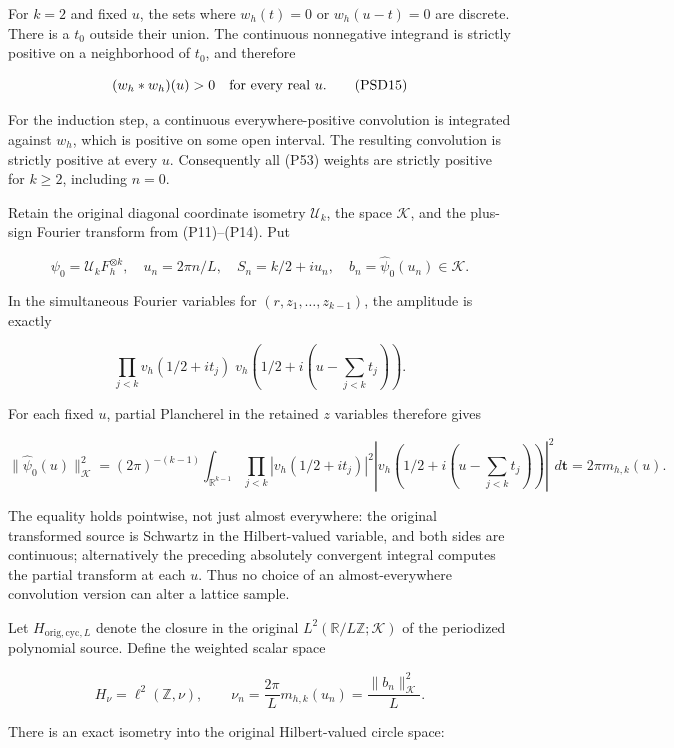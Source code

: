 For \(k=2\) and fixed \(u\), the sets where \(w_h(t)=0\) or \(w_h(u-t)=0\) are discrete. There is a \(t_0\) outside their union. The continuous nonnegative integrand is strictly positive on a neighborhood of \(t_0\), and therefore

\[
(w_h*w_h)(u)>0\quad\hbox{for every real }u.
\tag{PSD15}
\]

For the induction step, a continuous everywhere-positive convolution is integrated against \(w_h\), which is positive on some open interval. The resulting convolution is strictly positive at every \(u\). Consequently all (P53) weights are strictly positive for \(k\ge 2\), including \(n=0\).

Retain the original diagonal coordinate isometry \(\mathcal U_k\), the space \(\mathcal K\), and the plus-sign Fourier transform from (P11)--(P14). Put

\[
\psi_0=\mathcal U_kF_h^{\otimes k},\quad
u_n=2\pi n/L,\quad S_n=k/2+iu_n,\quad
b_n=\widehat\psi_0(u_n)\in\mathcal K.
\]

In the simultaneous Fourier variables for \((r,z_1,\ldots,z_{k-1})\), the amplitude is exactly

\[
\prod_{j<k}v_h(1/2+it_j)\;
v_h\left(1/2+i\left(u-\sum_{j<k}t_j\right)\right).
\]

For each fixed \(u\), partial Plancherel in the retained \(z\) variables therefore gives

\[
\|\widehat\psi_0(u)\|_{\mathcal K}^2
=(2\pi)^{-(k-1)}\int_{\mathbb R^{k-1}}
\prod_{j<k}|v_h(1/2+it_j)|^2
\left|v_h\left(1/2+i\left(u-\sum_{j<k}t_j\right)\right)\right|^2d\mathbf t
=2\pi m_{h,k}(u).
\tag{PSD16}
\]

The equality holds pointwise, not just almost everywhere: the original transformed source is Schwartz in the Hilbert-valued variable, and both sides are continuous; alternatively the preceding absolutely convergent integral computes the partial transform at each \(u\). Thus no choice of an almost-everywhere convolution version can alter a lattice sample.

Let \(H_{\mathrm{orig,cyc},L}\) denote the closure in the original \(L^2(\mathbb R/L\mathbb Z;\mathcal K)\) of the periodized polynomial source. Define the weighted scalar space

\[
H_\nu=\ell^2(\mathbb Z,\nu),\qquad
\nu_n=\frac{2\pi}{L}m_{h,k}(u_n)=\frac{\|b_n\|_{\mathcal K}^2}{L}.
\tag{PSD17}
\]

There is an exact isometry into the original Hilbert-valued circle space:

